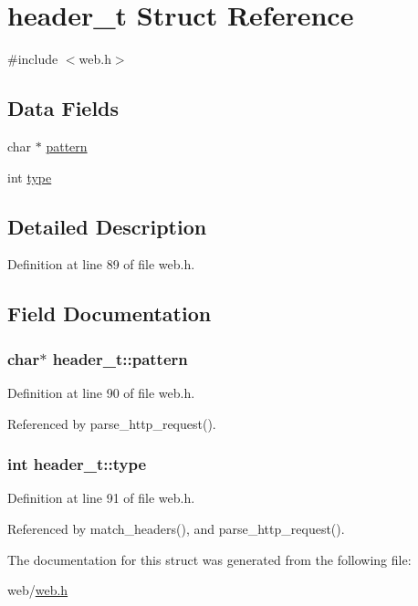 \hypertarget{structheader__t}{\section{header\-\_\-t Struct Reference}
\label{structheader__t}
}


{\ttfamily \#include $<$web.\-h$>$}

\subsection*{Data Fields}
\begin{DoxyCompactItemize}
\item 
char $\ast$ \hyperlink{structheader__t_a389d7564d1b1fd7b7ace82e15525e18c}{pattern}
\item 
int \hyperlink{structheader__t_a1f179d0a706f9ec29e1ac8ef9e67b8af}{type}
\end{DoxyCompactItemize}


\subsection{Detailed Description}


Definition at line 89 of file web.\-h.



\subsection{Field Documentation}
\hypertarget{structheader__t_a389d7564d1b1fd7b7ace82e15525e18c}{
\subsubsection[{pattern}]{\setlength{\rightskip}{0pt plus 5cm}char$\ast$ header\-\_\-t\-::pattern}}\label{structheader__t_a389d7564d1b1fd7b7ace82e15525e18c}


Definition at line 90 of file web.\-h.



Referenced by parse\-\_\-http\-\_\-request().

\hypertarget{structheader__t_a1f179d0a706f9ec29e1ac8ef9e67b8af}{
\subsubsection[{type}]{\setlength{\rightskip}{0pt plus 5cm}int header\-\_\-t\-::type}}\label{structheader__t_a1f179d0a706f9ec29e1ac8ef9e67b8af}


Definition at line 91 of file web.\-h.



Referenced by match\-\_\-headers(), and parse\-\_\-http\-\_\-request().



The documentation for this struct was generated from the following file\-:\begin{DoxyCompactItemize}
\item 
web/\hyperlink{web_8h}{web.\-h}\end{DoxyCompactItemize}
